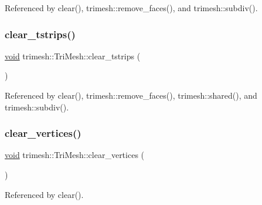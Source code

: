 Referenced by clear(), trimesh\+::remove\+\_\+faces(), and trimesh\+::subdiv().

\mbox{\label{classtrimesh_1_1TriMesh_abb09d4f62583b9cbb251224b69f5613d}} 
\subsubsection{\texorpdfstring{clear\+\_\+tstrips()}{clear\_tstrips()}}
{\footnotesize\ttfamily \hyperlink{namespacetrimesh_a784ddfd979e1c579bda795a8edfc3f43}{void} trimesh\+::\+Tri\+Mesh\+::clear\+\_\+tstrips (\begin{DoxyParamCaption}{ }\end{DoxyParamCaption})\hspace{0.3cm}{\ttfamily [inline]}}



Referenced by clear(), trimesh\+::remove\+\_\+faces(), trimesh\+::shared(), and trimesh\+::subdiv().

\mbox{\label{classtrimesh_1_1TriMesh_ac9fc425cb196cb1a2a12a6f2887c582f}} 
\subsubsection{\texorpdfstring{clear\+\_\+vertices()}{clear\_vertices()}}
{\footnotesize\ttfamily \hyperlink{namespacetrimesh_a784ddfd979e1c579bda795a8edfc3f43}{void} trimesh\+::\+Tri\+Mesh\+::clear\+\_\+vertices (\begin{DoxyParamCaption}{ }\end{DoxyParamCaption})\hspace{0.3cm}{\ttfamily [inline]}}



Referenced by clear().

\mbox{\label{classtrimesh_1_1TriMesh_a5216dbb4915371b21e751b55388bdb45}} 
